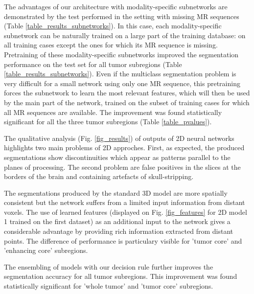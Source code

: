 \documentclass[preprint,12pt]{elsarticle}
\begin{document}
The advantages of our architecture with modality-specific subnetworks are demonstrated by the test performed in the setting with missing MR sequences (Table \ref{table_results_subnetworks}). In this case, each modality-specific subnetwork can be naturally trained on a large part of the training database: on all training cases except the ones for which its MR sequence is missing. Pretraining of these modality-specific subnetworks improved the segmentation performance on the test set for all tumor subregions (Table \ref{table_results_subnetworks}). Even if the multiclass segmentation problem is very difficult for a small network using only one MR sequence, this pretraining forces the subnetwork to learn the most relevant features, which will then be used by the main part of the network, trained on the subset of training cases for which all MR sequences are available. The improvement was found statistically significant for all the three tumor subregions (Table \ref{table_pvalues}).


 

The qualitative analysis (Fig. \ref{fig_results}) of outputs of 2D neural networks highlights two main problems of 2D approches. First, as expected, the produced segmentations show discontinuities which appear as patterns parallel to the planes of processing. The second problem are false positives in the slices at the borders of the brain and containing artefacts of skull-stripping.

The segmentations produced by the standard 3D model are more spatially consistent but the network suffers from a limited input information from distant voxels. The use of learned features (displayed on Fig. \ref{fig_features} for 2D model 1 trained on the first dataset) as an additional input to the network gives a considerable advantage by providing rich information extracted from distant points. The difference of performance is particulary visible for 'tumor core' and 'enhancing core' subregions. 

The ensembling of models with our decision rule further improves the segmentation accuracy for all tumor subregions. This improvement was found statistically significant for 'whole tumor' and 'tumor core' subregions.
\end{document}
